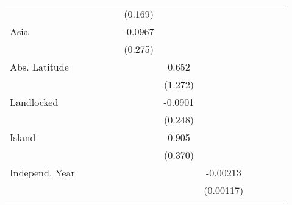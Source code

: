 \begin{sidewaystable}[h!]
\begin{threeparttable}
\begin{center}
\begin{minipage}{\textwidth}
\begin{tabular*}{\textwidth}{@{\extracolsep{\fill}}lccccccccccc@{\extracolsep{\fill}}}
            &                     &                     &                     &                     &     (0.169)         &                     &                     &                     \\
[0.125em]
Asia         &                     &                     &                     &                     &     -0.0967         &                     &                     &                     \\
            &                     &                     &                     &                     &     (0.275)         &                     &                     &                     \\
[0.125em]
Abs. Latitude    &                     &                     &                     &                     &                     &       0.652         &                     &                     \\
            &                     &                     &                     &                     &                     &     (1.272)         &                     &                     \\
[0.125em]
Landlocked    &                     &                     &                     &                     &                     &     -0.0901         &                     &                     \\
            &                     &                     &                     &                     &                     &     (0.248)         &                     &                     \\
[0.125em]
Island      &                     &                     &                     &                     &                     &       0.905\sym{**} &                     &                     \\
            &                     &                     &                     &                     &                     &     (0.370)         &                     &                     \\
[0.125em]
Independ. Year&                     &                     &                     &                     &                     &                     &    -0.00213\sym{*}  &                     \\
            &                     &                     &                     &                     &                     &                     &   (0.00117)         &                     \\

\end{tabular*}
\end{minipage}
\end{center}
\end{threeparttable}
\end{sidewaystable}
